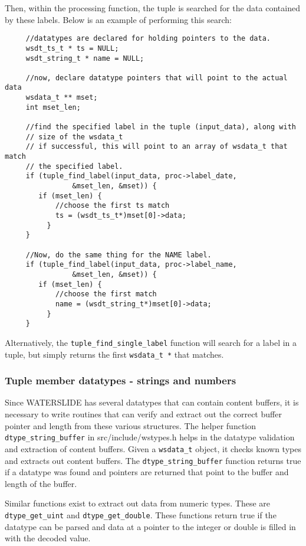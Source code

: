 \documentclass[11pt]{article}
\begin{document}
Then, within the processing function, the tuple is searched for the data 
contained by these labels.  Below is an example of performing this search:

\begin{lstlisting}
     //datatypes are declared for holding pointers to the data.
     wsdt_ts_t * ts = NULL;
     wsdt_string_t * name = NULL;

     //now, declare datatype pointers that will point to the actual data
     wsdata_t ** mset;
     int mset_len;

     //find the specified label in the tuple (input_data), along with 
     // size of the wsdata_t
     // if successful, this will point to an array of wsdata_t that match
     // the specified label.
     if (tuple_find_label(input_data, proc->label_date,
				&mset_len, &mset)) {
		if (mset_len) {
			//choose the first ts match
			ts = (wsdt_ts_t*)mset[0]->data;
          }
     }

     //Now, do the same thing for the NAME label.
     if (tuple_find_label(input_data, proc->label_name,
				&mset_len, &mset)) {
		if (mset_len) {
			//choose the first match
			name = (wsdt_string_t*)mset[0]->data;
          }
     }

\end{lstlisting}

Alternatively, the \texttt{tuple\_find\_single\_label} function will search for
a label in a tuple, but simply returns the first \texttt{wsdata\_t *} that 
matches.

\subsubsection{Tuple member datatypes - strings and numbers}
Since WATERSLIDE has several datatypes that can contain content buffers, it is
necessary to write routines that can verify and extract out the correct buffer 
pointer and length from these various structures. The helper function 
\texttt{dtype\_string\_buffer} in src/include/wstypes.h helps in the
datatype validation and extraction of content buffers.  Given a
\texttt{wsdata\_t} object, it checks known types and extracts out content 
buffers.  The \texttt{dtype\_string\_buffer} function returns true if a 
datatype was found and pointers are returned that point to the buffer and
length of the buffer.

Similar functions exist to extract out data from numeric types.  These are
\texttt{dtype\_get\_uint} and \texttt{dtype\_get\_double}.  These functions 
return true if the datatype can be parsed and data at a pointer to the integer
or double is filled in with the decoded value.
\end{document}
